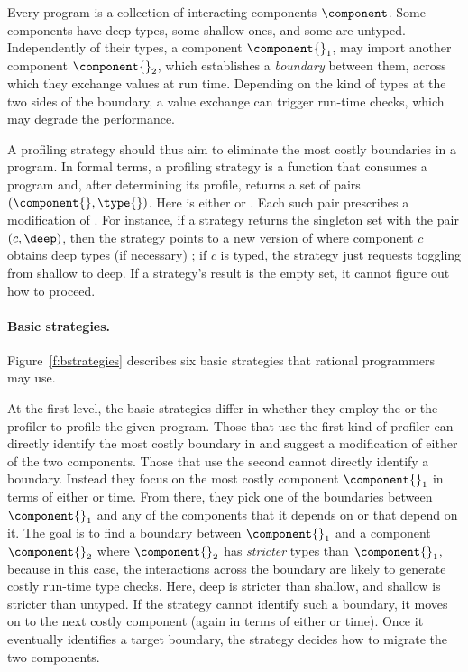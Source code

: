 Every program \program{} is a collection of interacting components $\component$.
Some components have deep types, some shallow ones, and some
are untyped. Independently of their types, a component $\component{}_1$, may
import another component $\component{}_2$, which establishes a \emph{boundary}
between them, across which they exchange values at run time. Depending on the
kind of types at the two sides of the boundary, a value exchange can trigger
run-time checks, which may degrade the performance.

A profiling strategy should thus aim to eliminate the most costly
boundaries in a program. In formal terms, a profiling strategy is a
function that consumes a program \program{} and, after determining its
profile, returns a set of pairs $(\component{}, \type{})$. Here \type{} is
either \deep{} or \shallow{}. Each such pair prescribes a modification of
\program{}. For instance, if a strategy returns the singleton set with the
pair $(c, \deep)$, then the strategy points to a new version of \program{}
where component $c$ obtains deep types (if necessary) ; if $c$ is typed,
the strategy just requests toggling from shallow to deep.  If a strategy's
result is the empty set, it cannot figure out how to proceed.



\paragraph{Basic strategies.}  Figure~\ref{f:bstrategies} describes six basic
 strategies that rational programmers may use. 

At the first level, the basic strategies differ in whether they employ the
 \featkw{} or the \statkw{} profiler to profile the given program.  Those that
 use the first kind of profiler can directly identify the most costly boundary
 in \program{} and suggest a modification of either of the two components.
 Those that use the second cannot directly identify a boundary.  Instead they
 focus on the most costly component $\component{}_1$ in terms of either
 \selfkw{} or \totalkw{} time.  From there, they pick one of the boundaries
 between $\component{}_1$ and any of the components that it depends on or that
 depend on it. The goal is to find a boundary between $\component{}_1$ and a
 component $\component{}_2$ where $\component{}_2$ has \emph{stricter} types
 than $\component{}_1$, because in this case, the interactions across the
 boundary are likely to generate costly run-time type checks. Here, deep is
 stricter than shallow, and shallow is stricter than untyped. If the strategy
 cannot identify such a boundary, it moves on to the next costly component
 (again in terms of either \selfkw{} or \totalkw{} time). Once it eventually
 identifies a target boundary, the strategy decides how to migrate the
 two components.


